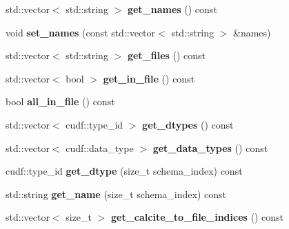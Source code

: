 \begin{DoxyCompactItemize}
std\+::vector$<$ std\+::string $>$ {\bfseries get\+\_\+names} () const
\item 
\mbox{\label{classral_1_1io_1_1Schema_a62fec8bebabfaffd202cdafb8890b2c3}} 
void {\bfseries set\+\_\+names} (const std\+::vector$<$ std\+::string $>$ \&names)
\item 
\mbox{\label{classral_1_1io_1_1Schema_a7b3794e4d9fab810ecdeac9c50c5ab25}} 
std\+::vector$<$ std\+::string $>$ {\bfseries get\+\_\+files} () const
\item 
\mbox{\label{classral_1_1io_1_1Schema_a600d2b8054199d240e7369201110d3ab}} 
std\+::vector$<$ bool $>$ {\bfseries get\+\_\+in\+\_\+file} () const
\item 
\mbox{\label{classral_1_1io_1_1Schema_a608e6c054dd10d92ea4a96dd968fab5e}} 
bool {\bfseries all\+\_\+in\+\_\+file} () const
\item 
\mbox{\label{classral_1_1io_1_1Schema_a17c135c4be793339b7cdd61d0ce8f511}} 
std\+::vector$<$ cudf\+::type\+\_\+id $>$ {\bfseries get\+\_\+dtypes} () const
\item 
\mbox{\label{classral_1_1io_1_1Schema_ab4a678f32499a8a758c80d04e7298342}} 
std\+::vector$<$ cudf\+::data\+\_\+type $>$ {\bfseries get\+\_\+data\+\_\+types} () const
\item 
\mbox{\label{classral_1_1io_1_1Schema_a17b9855455952df8a80748510322b4e7}} 
cudf\+::type\+\_\+id {\bfseries get\+\_\+dtype} (size\+\_\+t schema\+\_\+index) const
\item 
\mbox{\label{classral_1_1io_1_1Schema_a3aa7f563ec5fdbe83de9926b4bfae19f}} 
std\+::string {\bfseries get\+\_\+name} (size\+\_\+t schema\+\_\+index) const
\item 
\mbox{\label{classral_1_1io_1_1Schema_a17514bd3d13a571e02d00cce6ba961f7}} 
std\+::vector$<$ size\+\_\+t $>$ {\bfseries get\+\_\+calcite\+\_\+to\+\_\+file\+\_\+indices} () const
\item 
\mbox{\label{classral_1_1io_1_1Schema_af5b0407feaf0afecd538693072a867b1}} 

\end{DoxyCompactItemize}
